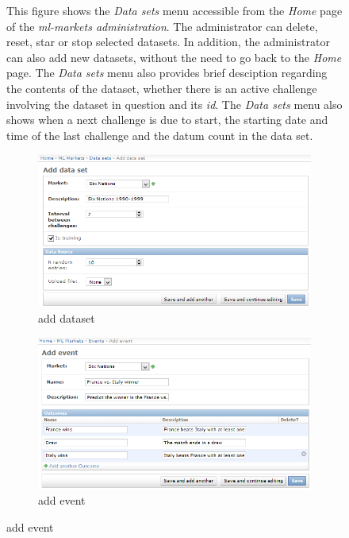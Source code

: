 \documentclass[bsc,frontabs,twoside,singlespacing,parskip,deptreport]{infthesis}     %
\begin{document}
\begin{itemize}
\begin{figure}
\label{fig:dataset-actions}
{This figure shows the {\it Data sets} menu accessible from the {\it Home} page of the {\it ml-markets administration}. The administrator can delete, reset, star or stop selected datasets. In addition, the administrator can also add new datasets, without the need to go back to the  {\it Home} page. The {\it Data sets} menu also provides brief desciption regarding the contents of the dataset, whether there is an active challenge involving the dataset in question and its {\it id}. The {\it Data sets} menu also shows when a next challenge is due to start, the starting date and time of the last challenge and the datum count in the data set.} 
\end{figure}

\begin{figure}
\caption{market actions}

\begin{subfigure}{.8\textwidth}
  \includegraphics[width=1\linewidth]{figures/admin-dataset-add(c).png}
  \caption{add dataset}
   \label{fig:add-dataset}
\end{subfigure}%

\begin{subfigure}{.8\textwidth}

  \includegraphics[width=1\linewidth]{figures/admin-event-add(c).png}
  \caption{add event}
  \label{fig:add-event}
\end{subfigure}


\end{figure}
\end{itemize}
\end{document}

